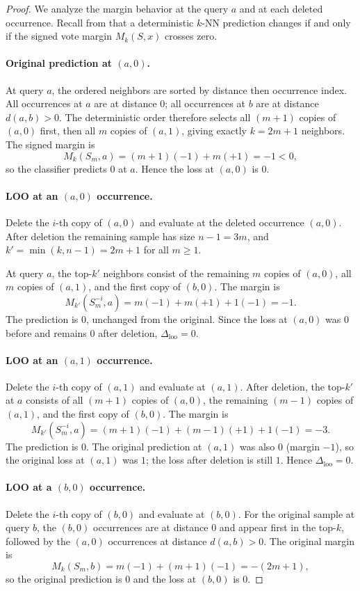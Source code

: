 \begin{proof}
We analyze the margin behavior at the query $a$ and at each deleted occurrence.
Recall from  that a deterministic $k$-NN prediction changes
if and only if the signed vote margin $M_k(S, x)$ crosses zero.

\paragraph{Original prediction at $(a,0)$.}
At query $a$, the ordered neighbors are sorted by distance then occurrence index.
All occurrences at $a$ are at distance $0$; all occurrences at $b$ are at
distance $d(a,b) > 0$. The deterministic order therefore selects all
$(m+1)$ copies of $(a,0)$ first, then all $m$ copies of $(a,1)$, giving exactly
$k = 2m+1$ neighbors. The signed margin is
\[
M_k(S_m, a) = (m+1)(-1) + m(+1) = -1 < 0,
\]
so the classifier predicts $0$ at $a$. Hence the loss at $(a,0)$ is $0$.

\paragraph{LOO at an $(a,0)$ occurrence.}
Delete the $i$-th copy of $(a,0)$ and evaluate at the deleted occurrence
$(a,0)$. After deletion the remaining sample has size $n-1 = 3m$, and
$k' = \min(k, n-1) = 2m+1$ for all $m \ge 1$.

At query $a$, the top-$k'$ neighbors consist of the remaining $m$ copies
of $(a,0)$, all $m$ copies of $(a,1)$, and the first copy of $(b,0)$.
The margin is
\[
M_{k'}(S_m^{-i}, a) = m(-1) + m(+1) + 1(-1) = -1.
\]
The prediction is $0$, unchanged from the original. Since the loss at $(a,0)$
was $0$ before and remains $0$ after deletion, $\Delta_{\mathrm{loo}} = 0$.

\paragraph{LOO at an $(a,1)$ occurrence.}
Delete the $i$-th copy of $(a,1)$ and evaluate at $(a,1)$. After deletion,
the top-$k'$ at $a$ consists of all $(m+1)$ copies of $(a,0)$, the remaining
$(m-1)$ copies of $(a,1)$, and the first copy of $(b,0)$. The margin is
\[
M_{k'}(S_m^{-i}, a) = (m+1)(-1) + (m-1)(+1) + 1(-1) = -3.
\]
The prediction is $0$. The original prediction at $(a,1)$ was also $0$
(margin $-1$), so the original loss at $(a,1)$ was $1$; the loss after deletion
is still $1$. Hence $\Delta_{\mathrm{loo}} = 0$.

\paragraph{LOO at a $(b,0)$ occurrence.}
Delete the $i$-th copy of $(b,0)$ and evaluate at $(b,0)$. For the original
sample at query $b$, the $(b,0)$ occurrences are at distance $0$ and appear
first in the top-$k$, followed by the $(a,0)$ occurrences at distance
$d(a,b) > 0$. The original margin is
\[
M_k(S_m, b) = m(-1) + (m+1)(-1) = -(2m+1),
\]
so the original prediction is $0$ and the loss at $(b,0)$ is $0$.


\end{proof}
